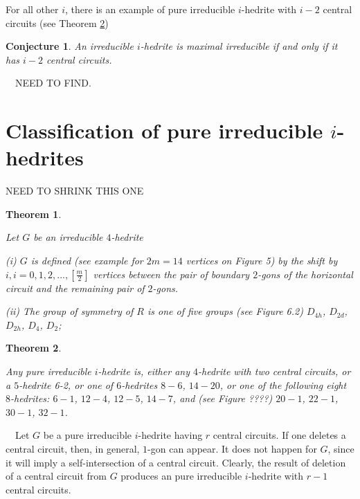 \documentclass[12pt]{article}
\newtheorem{theor}{Theorem}
\newtheorem{conjecture}{Conjecture}
\newcommand{\proof}{\noindent{\bf Proof.}\ \ }
\begin{document}
For all other $i$, there is an example of pure irreducible $i$-hedrite with $i-2$ central circuits (see Theorem \ref{TheOneWithSimpleCentralCircuit})















\begin{conjecture}
An irreducible $i$-hedrite is maximal irreducible if and only if it has $i-2$ central circuits.
\end{conjecture}
\proof NEED TO FIND.



\section{Classification of pure irreducible $i$-hedrites}

NEED TO SHRINK THIS ONE
\begin{theor}\label{Theorem-for-4-hedrite}

Let $G$ be an irreducible $4$-hedrite

(i) $G$ is defined (see example for $2m=14$ vertices on Figure 5) by the shift by $i, i=0,1,2,..., [\frac{m}{2}]$ vertices between the pair
of boundary $2$-gons of the horizontal circuit and the remaining pair of
$2$-gons.

(ii) The group of symmetry of $R$ is one of five groups (see Figure 6.2)
$D_{4h}$, $D_{2d}$, $D_{2h}$, $D_4$, $D_2$;

\end{theor}










\begin{theor}\label{TheOneWithSimpleCentralCircuit}

Any pure irreducible $i$-hedrite is, either any $4$-hedrite with two
central circuits, or a $5$-hedrite 6-2, or one of $6$-hedrites $8-6$, 
$14-20$, or one of the following eight $8$-hedrites: $6-1$, $12-4$, 
$12-5$, $14-7$, and (see Figure ????) $20-1$, $22-1$, $30-1$, $32-1$.


\end{theor}


\proof Let $G$ be a pure irreducible $i$-hedrite having $r$ central circuits. 
If one deletes a central circuit, then, in general, $1$-gon can appear. It 
does not happen for $G$, since it will imply a self-intersection of a central 
circuit. Clearly, the result of deletion of a central circuit from $G$ 
produces an pure irreducible $i$-hedrite with $r-1$ central circuits.
\end{document}
